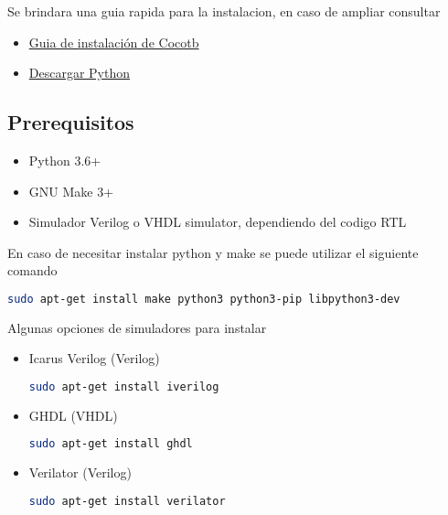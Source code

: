 \documentclass[a4paper,12pt]{article}
\begin{document}
Se brindara una guia rapida para la instalacion, en caso de ampliar consultar

\begin{itemize}
	\item \href{https://docs.cocotb.org/en/stable/install.html#install-prerequisites}{Guia de instalación de Cocotb}
	\item \href{https://www.python.org/downloads/}{Descargar Python}
\end{itemize}

\subsection{Prerequisitos}


\begin{itemize}
	\item Python 3.6+
	\item GNU Make 3+
	\item Simulador Verilog o VHDL simulator, dependiendo del codigo RTL
\end{itemize}

En caso de necesitar instalar python y make se puede utilizar el siguiente comando

\begin{lstlisting}[language=bash]
sudo apt-get install make python3 python3-pip libpython3-dev
\end{lstlisting}

Algunas opciones de simuladores para instalar

\begin{itemize}
	
\item Icarus Verilog (Verilog)
\begin{lstlisting}[language=bash]
sudo apt-get install iverilog
\end{lstlisting}

\item GHDL (VHDL)
\begin{lstlisting}[language=bash]
sudo apt-get install ghdl
\end{lstlisting}

\item Verilator (Verilog)
\begin{lstlisting}[language=bash]
sudo apt-get install verilator
\end{lstlisting}
\end{itemize}
\end{document}
